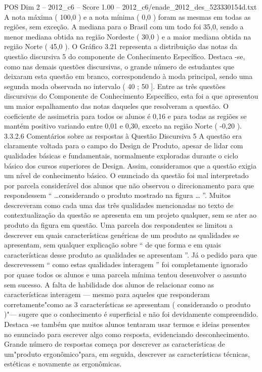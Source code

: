 \begin{textsample}{POS Dim 2 – 2012\_c6 – Score 1.00 – 2012\_c6/enade\_2012\_des\_523330154d.txt}
A nota máxima ( 100,0 ) e a nota mínima ( 0,0 ) foram as mesmas em todas as regiões, sem exceção.
A mediana para o Brasil com um todo foi 35,0, sendo a menor mediana obtida na região Nordeste ( 30,0 ) e a maior mediana obtida na região Norte ( 45,0 ).
O Gráfico 3.21 representa a distribuição das notas da questão discursiva 5 do componente de Conhecimento Específico.
Destaca -se, como nas demais questões discursivas, o grande número de estudantes que deixaram esta questão em branco, correspondendo à moda principal, sendo uma segunda moda observada no intervalo ( 40 ; 50 ].
Entre as três questões discursivas do Componente de Conhecimento Específico, esta foi a que apresentou um maior espalhamento das notas daqueles que resolveram a questão.
O coeficiente de assimetria para todos os alunos é 0,16 e para todas as regiões se mantém positivo variando entre 0,01 e 0,30, exceto na região Norte ( -0,20 ). 3.3.2.6 Comentários sobre as respostas à Questão Discursiva 5 A questão era claramente voltada para o campo do Design de Produto, apesar de lidar com qualidades básicas e fundamentais, normalmente exploradas durante o ciclo básico dos cursos superiores de Design.
Assim, consideramos que a questão exigia um nível de conhecimento básico.
O enunciado da questão foi mal interpretado por parcela considerável dos alunos que não observou o direcionamento para que respondessem “ …considerando o produto mostrado na figura … ”.
Muitos descreveram como cada uma das três qualidades mencionadas no texto de contextualização da questão se apresenta em um projeto qualquer, sem se ater ao produto da figura em questão.
Uma parcela dos respondentes se limitou a descrever em quais características genéricas de um produto as qualidades se apresentam, sem qualquer explicação sobre “ de que forma e em quais características desse produto as qualidades se apresentam ”.
Já o pedido para que descrevessem “ como estas qualidades interagem ” foi completamente ignorado por quase todos os alunos e uma parcela mínima tentou desenvolver o assunto sem sucesso.
A falta de habilidade dos alunos de relacionar como as características interagem — mesmo para aqueles que responderam corretamente"como as 3 características se apresentam ( considerando o produto )"— sugere que o conhecimento é superficial e não foi devidamente compreendido.
Destaca -se também que muitos alunos tentaram usar termos e ideias presentes no enunciado para escrever algo como resposta, evidenciando desconhecimento.
Grande número de respostas começa por descrever as características de um"produto ergonômico"para, em seguida, descrever as características técnicas, estéticas e novamente as ergonômicas.

\end{textsample}

